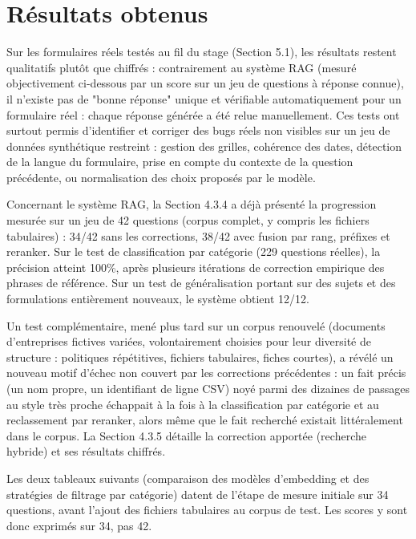 \documentclass[12pt,a4paper]{report}
\begin{document}
\section{Résultats obtenus}

Sur les formulaires réels testés au fil du stage (Section 5.1), les
résultats restent qualitatifs plutôt que chiffrés : contrairement au
système RAG (mesuré objectivement ci-dessous par un score sur un jeu de
questions à réponse connue), il n'existe pas de "bonne réponse" unique
et vérifiable automatiquement pour un formulaire réel : chaque réponse
générée a été relue manuellement. Ces tests ont surtout permis
d'identifier et corriger des bugs réels non visibles sur un jeu de
données synthétique restreint : gestion des grilles, cohérence des
dates, détection de la langue du formulaire, prise en compte du
contexte de la question précédente, ou normalisation des choix proposés
par le modèle.

Concernant le système RAG, la Section 4.3.4 a déjà présenté la
progression mesurée sur un jeu de 42 questions (corpus complet, y
compris les fichiers tabulaires) : 34/42 sans les corrections, 38/42
avec fusion par rang, préfixes et reranker. Sur le test de
classification par catégorie (229 questions réelles), la précision
atteint 100\%, après plusieurs itérations de correction empirique des
phrases de référence. Sur un test de généralisation portant sur des
sujets et des formulations entièrement nouveaux, le système obtient
12/12.

Un test complémentaire, mené plus tard sur un corpus renouvelé
(documents d'entreprises fictives variées, volontairement choisies pour
leur diversité de structure : politiques répétitives, fichiers
tabulaires, fiches courtes), a révélé un nouveau motif d'échec non
couvert par les corrections précédentes : un fait précis (un nom propre,
un identifiant de ligne CSV) noyé parmi des dizaines de passages au
style très proche échappait à la fois à la classification par catégorie
et au reclassement par reranker, alors même que le fait recherché
existait littéralement dans le corpus. La Section 4.3.5 détaille la
correction apportée (recherche hybride) et ses résultats chiffrés.

Les deux tableaux suivants (comparaison des modèles d'embedding et des
stratégies de filtrage par catégorie) datent de l'étape de mesure
initiale sur 34 questions, avant l'ajout des fichiers tabulaires au
corpus de test. Les scores y sont donc exprimés sur 34, pas 42.
\end{document}
